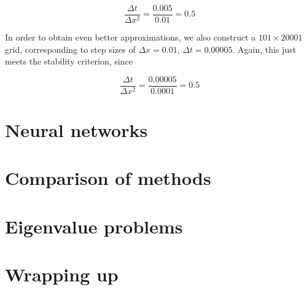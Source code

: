 \documentclass{article}
\begin{document}
\begin{equation}
    \frac{\Delta t}{\Delta x^2} = \frac{0.005}{0.01}=0.5
\end{equation}

In order to obtain even better approximations, we also construct a $101 \times 20001$ grid, corresponding to step sizes of $\Delta x = 0.01$, $\Delta t = 0.00005$. Again, this just meets the stability criterion, since

\begin{equation}
    \frac{\Delta t}{\Delta x^2} = \frac{0.00005}{0.0001}=0.5
\end{equation}

\section{Neural networks}

\section{Comparison of methods}

\section{Eigenvalue problems}

\section{Wrapping up}
\end{document}

